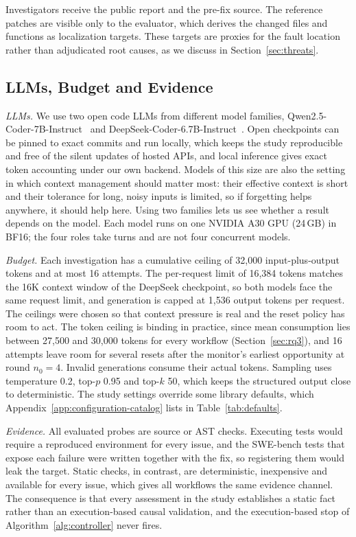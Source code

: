 \documentclass[a4paper,fleqn]{cas-sc}
\begin{document}
Investigators receive the public report and the pre-fix source. The reference patches are visible only to the evaluator, which derives the changed files and functions as localization targets. These targets are proxies for the fault location rather than adjudicated root causes, as we discuss in Section~\ref{sec:threats}.

\subsection{LLMs, Budget and Evidence}\label{sec:runtime}
\emph{LLMs.} We use two open code LLMs from different model families, Qwen2.5-Coder-7B-Instruct~\citep{qwen25coder2024} and DeepSeek-Coder-6.7B-Instruct~\citep{deepseekcoder2024}. Open checkpoints can be pinned to exact commits and run locally, which keeps the study reproducible and free of the silent updates of hosted APIs, and local inference gives exact token accounting under our own backend. Models of this size are also the setting in which context management should matter most: their effective context is short and their tolerance for long, noisy inputs is limited, so if forgetting helps anywhere, it should help here. Using two families lets us see whether a result depends on the model. Each model runs on one NVIDIA A30 GPU (24\,GB) in BF16; the four roles take turns and are not four concurrent models.

\emph{Budget.} Each investigation has a cumulative ceiling of 32,000 input-plus-output tokens and at most 16 attempts. The per-request limit of 16,384 tokens matches the 16K context window of the DeepSeek checkpoint, so both models face the same request limit, and generation is capped at 1,536 output tokens per request. The ceilings were chosen so that context pressure is real and the reset policy has room to act. The token ceiling is binding in practice, since mean consumption lies between 27,500 and 30,000 tokens for every workflow (Section~\ref{sec:rq3}), and 16 attempts leave room for several resets after the monitor's earliest opportunity at round $n_0=4$. Invalid generations consume their actual tokens. Sampling uses temperature 0.2, top-$p$ 0.95 and top-$k$ 50, which keeps the structured output close to deterministic. The study settings override some library defaults, which Appendix~\ref{app:configuration-catalog} lists in Table~\ref{tab:defaults}.

\emph{Evidence.} All evaluated probes are source or AST checks. Executing tests would require a reproduced environment for every issue, and the SWE-bench tests that expose each failure were written together with the fix, so registering them would leak the target. Static checks, in contrast, are deterministic, inexpensive and available for every issue, which gives all workflows the same evidence channel. The consequence is that every assessment in the study establishes a static fact rather than an execution-based causal validation, and the execution-based stop of Algorithm~\ref{alg:controller} never fires.
\end{document}
